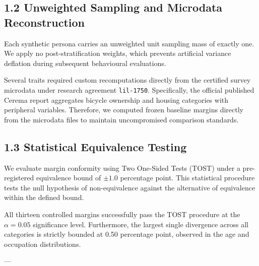 \subsection{1.2 Unweighted Sampling and Microdata Reconstruction}

Each synthetic persona carries an unweighted unit sampling mass of exactly one. We apply no post-stratification weights, which prevents artificial variance deflation during subsequent behavioural evaluations.

Several traits required custom recomputations directly from the certified survey microdata under research agreement \texttt{lil-1750}. Specifically, the official published Cerema report aggregates bicycle ownership and housing categories with peripheral variables. Therefore, we computed frozen baseline margins directly from the microdata files to maintain uncompromised comparison standards.

\subsection{1.3 Statistical Equivalence Testing}

We evaluate margin conformity using Two One-Sided Tests (TOST) under a pre-registered equivalence bound of $\pm 1.0$ percentage point. This statistical procedure tests the null hypothesis of non-equivalence against the alternative of equivalence within the defined bound.

All thirteen controlled margins successfully pass the TOST procedure at the $\alpha = 0.05$ significance level. Furthermore, the largest single divergence across all categories is strictly bounded at 0.50 percentage point, observed in the age and occupation distributions.

---
